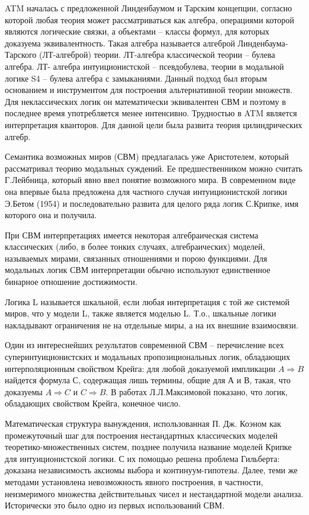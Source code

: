 \documentclass[12pt, a4paper]{article}
\begin{document}
ATM началась с предложенной Линденбаумом и Тарским концепции, согласно которой любая теория
может рассматриваться как алгебра, операциями которой являются логические связки, а объектами –
классы формул, для которых доказуема эквивалентность. Такая алгебра называется алгеброй
Линденбаума-Тарского (ЛТ-алгеброй) теории. ЛТ-алгебра классической теории – булева алгебра. ЛТ-
алгебра интуиционистской – псевдобулева, теории в модальной логике S4 – булева алгебра с
замыканиями. Данный подход был вторым основанием и инструментом для построения альтернативной
теории множеств. Для неклассических логик он математически эквивалентен СВМ и поэтому в
последнее время употребляется менее интенсивно. Трудностью в ATM является интерпретация
кванторов. Для данной цели была развита теория цилиндрических алгебр.

Семантика возможных миров (СВМ) предлагалась уже Аристотелем, который рассматривал теорию
модальных суждений. Ее предшественником можно считать Г.Лейбница, который явно ввел понятие
возможного мира. В современном виде она впервые была предложена для частного случая
интуиционистской логики Э.Бетом (1954) и последовательно развита для целого ряда логик
С.Крипке, имя которого она и получила.

При СВМ интерпретациях имеется некоторая алгебраическая система классических (либо, в более
тонких случаях, алгебраических) моделей, называемых мирами, связанных отношениями и порою
функциями. Для модальных логик СВМ интерпретации обычно используют единственное бинарное
отношение достижимости.

Логика L называется шкальной, если любая интерпретация с той же системой миров, что у модели L,
также является моделью L. Т.о., шкальные логики накладывают ограничения не на отдельные миры, а
на их внешние взаимосвязи.

Один из интереснейших результатов современной СВМ – перечисление всех суперинтуиционистских и
модальных пропозициональных логик, обладающих интерполяционным свойством Крейга: для любой
доказуемой импликации $A \Rightarrow B $ найдется формула С, содержащая лишь термины, общие для А и В, такая, что доказуемы $A \Rightarrow C$ и $C \Rightarrow B$. В работах Л.Л.Максимовой показано,
что логик, обладающих свойством Крейга, конечное число.

Математическая структура вынуждения, использованная П. Дж. Коэном как промежуточный шаг для
построения нестандартных классических моделей теоретико-множественных систем, позднее получила
название моделей Крипке для интуиционистской логики. С их помощью решена проблема
Гильберта: доказана независимость аксиомы выбора и континуум-гипотезы. Далее, теми же методами
установлена невозможность явного построения, в частности, неизмеримого множества действительных
чисел и нестандартной модели анализа. Исторически это было одно из первых использований СВМ.
\end{document}
